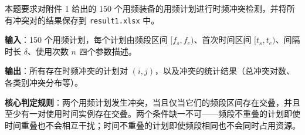 
本题要求对附件 1 给出的 150 个用频装备的用频计划进行时频冲突检测，并将所有冲突对的结果保存到 \texttt{result1.xlsx} 中。

\textbf{输入}：150 个用频计划，每个计划由频段区间 $[f_s, f_e)$、首次时间区间 $[t_s, t_e)$、间隔时长 $\delta$、使用次数 $n$ 四个参数描述。

\textbf{输出}：所有存在时频冲突的计划对 $(i, j)$，以及冲突的统计结果（总冲突对数、各类别冲突分布等）。

\textbf{核心判定规则}：两个用频计划发生冲突，当且仅当它们的频段区间存在交叠，并且至少有一对使用时间实例存在交叠。两个条件缺一不可——频段不重叠的计划即使时间重叠也不会相互干扰；时间不重叠的计划即使频段相同也不会同时占用资源。
